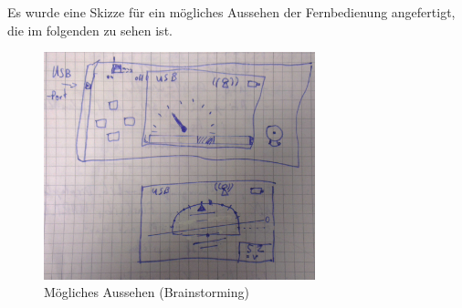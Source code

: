 Es wurde eine Skizze für ein mögliches Aussehen der Fernbedienung angefertigt, die im folgenden zu sehen ist.

\begin{figure}[h]
	\centering
	\includegraphics[width=0.7\textwidth]{bilder/idee_controller.jpg}
	\caption{Mögliches Aussehen (Brainstorming)}
	\label{img:idee_controller}
\end{figure}



